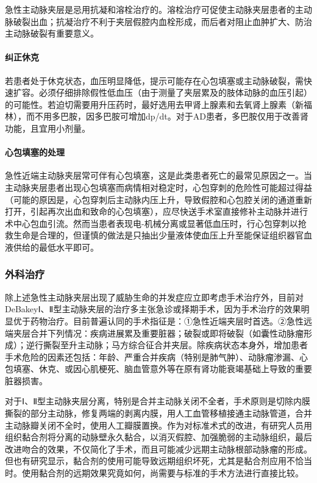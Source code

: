 急性主动脉夹层是忌用抗凝和溶栓治疗的。溶栓治疗可促使主动脉夹层患者的主动脉破裂出血；抗凝治疗不利于夹层假腔内血栓形成，而后者对阻止血肿扩大、防治主动脉破裂有重要意义。

\paragraph{纠正休克}

若患者处于休克状态，血压明显降低，提示可能存在心包填塞或主动脉破裂，需快速扩容。必须仔细排除假性低血压（由于测量了夹层累及的肢体动脉的血压引起）的可能性。若迫切需要用升压药时，最好选用去甲肾上腺素和去氧肾上腺素（新福林），而不用多巴胺，因多巴胺可增加dp/dt。对于AD患者，多巴胺仅用于改善肾功能，且宜用小剂量。

\paragraph{心包填塞的处理}

急性近端主动脉夹层常可伴有心包填塞，这是此类患者死亡的最常见原因之一。当主动脉夹层患者出现心包填塞而病情相对稳定时，心包穿刺的危险性可能超过得益（可能的原因是，心包穿刺后主动脉内压上升，导致假腔和心包腔关闭的通道重新打开，引起再次出血和致命的心包填塞），应尽快送手术室直接修补主动脉并进行术中心包血引流。然而当患者表现电-机械分离或显著低血压时，行心包穿刺以抢救生命是合理的，但谨慎的做法是只抽出少量液体使血压上升至能保证组织器官血液供给的最低水平即可。

\subsubsection{外科治疗}

除上述急性主动脉夹层出现了威胁生命的并发症应立即考虑手术治疗外，目前对DeBakeyⅠ、Ⅱ型主动脉夹层的治疗多主张急诊或择期手术，因为手术治疗的效果明显优于药物治疗。目前普遍认同的手术指征是：①急性近端夹层时首选。②急性远端夹层合并下列情况：疾病进展累及重要脏器；破裂或即将破裂（如囊性动脉瘤形成）；逆行撕裂至升主动脉；马方综合征合并夹层。除疾病状态本身外，增加患者手术危险的因素还包括：年龄、严重合并疾病（特别是肺气肿）、动脉瘤渗漏、心包填塞、休克、或因心肌梗死、脑血管意外等在原有肾功能衰竭基础上导致的重要脏器损害。

对于Ⅰ、Ⅱ型主动脉夹层分离，特别是合并主动脉关闭不全者，手术原则是切除内膜撕裂的部分主动脉，修复两端的剥离内膜，用人工血管移植接通主动脉管道，合并主动脉瓣关闭不全时，使用人工瓣膜置换。作为对标准术式的改进，有研究人员用组织黏合剂将分离的动脉壁永久黏合，以消灭假腔、加强脆弱的主动脉组织，最后改进吻合的效果，不仅简化了手术，而且可能减少远期主动脉根部动脉瘤的形成。但也有研究显示，黏合剂的使用可能导致远期组织坏死，尤其是黏合剂应用不恰当时。使用黏合剂的远期效果究竟如何，尚需要与标准的手术方法进行直接比较。

